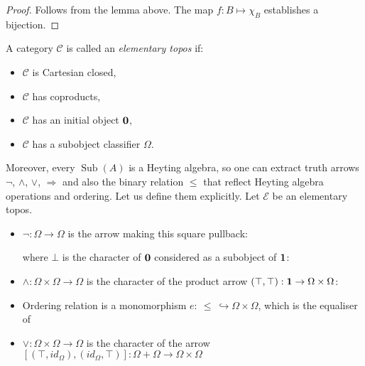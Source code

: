 \documentclass[a4paper]{article}
\theoremstyle{defin}
\theoremstyle{theorem}
\theoremstyle{claim}
\theoremstyle{prop}
\theoremstyle{lemma}
\theoremstyle{fact}
\theoremstyle{ex}
\theoremstyle{col}
\begin{document}
\begin{proof}
Follows from the lemma above. The map $f : B \mapsto \chi_B$ establishes a bijection.
\end{proof}

A category $\mathcal{C}$ is called an \emph{elementary topos} if:
\begin{itemize}
\item $\mathcal{C}$ is Cartesian closed,
\item $\mathcal{C}$ has coproducts,
\item $\mathcal{C}$ has an initial object ${\bf 0}$,
\item $\mathcal{C}$ has a subobject classifier $\Omega$.
\end{itemize}

Moreover, every $\operatorname{Sub}(A)$ is a Heyting algebra, so one can extract truth arrows $\neg$, $\land$, $\vee$, $\Rightarrow$ and also the binary relation $\leq$ that reflect Heyting algebra operations and ordering. Let us define them explicitly. Let $\mathcal{E}$ be an elementary topos.
\begin{itemize}
\item $\neg : \Omega \to \Omega$ is the arrow making this square pullback:

\centerline{
}

where $\bot$ is the character of ${\bf 0}$ considered as a subobject of ${\bf 1}$:

\centerline{
}
\item $\wedge : \Omega \times \Omega \to \Omega$ is the character of the product arrow $(\top, \top) : {\bf 1} \to \Omega \times \Omega$:

\centerline{
}
\item Ordering relation is a monomorphism $e : \: \leq \: \hookrightarrow \Omega \times \Omega$, which is the equaliser of

\centerline{
}

\item $\vee : \Omega \times \Omega \to \Omega$ is the character of the arrow $[(\top, id_{\Omega}),(id_{\Omega}, \top)] : \Omega + \Omega \to \Omega \times \Omega$
\end{itemize}
\end{document}
